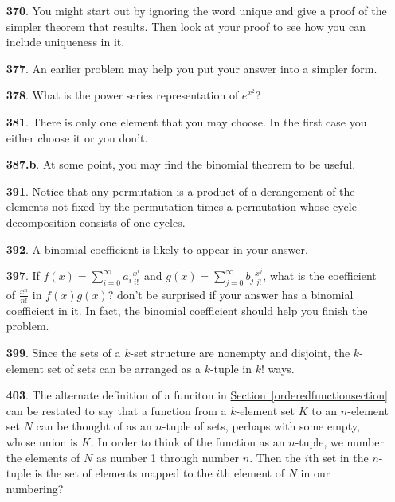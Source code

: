\documentclass[10pt,]{book}
\theoremstyle{plain}
\theoremstyle{definition}
\theoremstyle{definition}
\numberwithin{equation}{chapter}
\begin{document}
\begin{itemize}[itemsep=1em]
\item[\textbf{370}.]\hypertarget{p-2033}{}%
You might start out by ignoring the word unique and give a proof of the simpler theorem that results. Then look at your proof to see how you can include uniqueness in it.%

\item[\textbf{377}.]\hypertarget{p-2057}{}%
An earlier problem may help you put your answer into a simpler form.%

\item[\textbf{378}.]\hypertarget{p-2060}{}%
What is the power series representation of \(e^{x^2}\)?%

\item[\textbf{381}.]\hypertarget{p-2068}{}%
There is only one element that you may choose. In the first case you either choose it or you don't.%

\item[\textbf{387.b}.]\hypertarget{p-2091}{}%
At some point, you may find the binomial theorem to be useful.%

\item[\textbf{391}.]\hypertarget{p-2106}{}%
Notice that any permutation is a product of a derangement of the elements not fixed by the permutation times a permutation whose cycle decomposition consists of one-cycles.%

\item[\textbf{392}.]\hypertarget{p-2110}{}%
A binomial coefficient is likely to appear in your answer.%

\item[\textbf{397}.]\hypertarget{p-2127}{}%
If \(f(x) = \sum_{i=0}^\infty a_i \frac{x^i}{i!}\) and \(g(x) = \sum_{j=0}^\infty b_j\frac{x^j}{j!}\), what is the coefficient of \(\frac{x^n}{n!}\) in \(f(x)g(x)\)?  don't be surprised if your answer has a binomial coefficient in it.  In fact, the binomial coefficient should help you finish the problem.%

\item[\textbf{399}.]\hypertarget{p-2137}{}%
Since the sets of a \(k\)-set structure are nonempty and disjoint, the \(k\)-element set of sets can be arranged as a \(k\)-tuple in \(k!\) ways.%

\item[\textbf{403}.]\hypertarget{p-2147}{}%
The alternate definition of a funciton in \hyperref[orderedfunctionsection]{Section~\ref{orderedfunctionsection}} can be restated to say that a function from a \(k\)-element set \(K\) to an \(n\)-element set \(N\) can be thought of as an \(n\)-tuple of sets, perhaps with some empty, whose union is \(K\). In order to think of the function as an \(n\)-tuple, we number the elements of \(N\) as number 1 through number \(n\). Then the \(i\)th set in the \(n\)-tuple is the set of elements mapped to the \(i\)th element of \(N\) in our numbering?%


\end{itemize}
\end{document}

